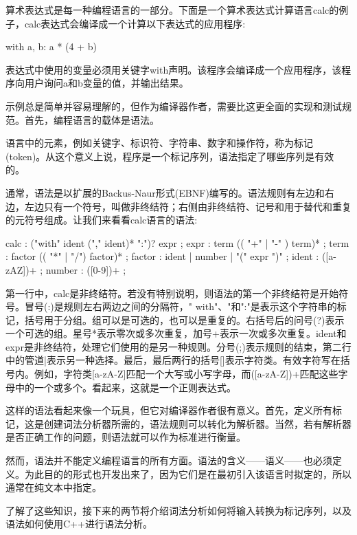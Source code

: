 
算术表达式是每一种编程语言的一部分。下面是一个算术表达式计算语言calc的例子，calc表达式会编译成一个计算以下表达式的应用程序:

\begin{shell}
with a, b: a * (4 + b)
\end{shell}

表达式中使用的变量必须用关键字with声明。该程序会编译成一个应用程序，该程序向用户询问a和b变量的值，并输出结果。

示例总是简单并容易理解的，但作为编译器作者，需要比这更全面的实现和测试规范。首先，编程语言的载体是语法。


语言中的元素，例如关键字、标识符、字符串、数字和操作符，称为标记(token)。从这个意义上说，程序是一个标记序列，语法指定了哪些序列是有效的。

通常，语法是以扩展的Backus-Naur形式(EBNF)编写的。语法规则有左边和右边，左边只有一个符号，叫做非终结符；右侧由非终结符、记号和用于替代和重复的元符号组成。让我们来看看calc语言的语法:

\begin{shell}
calc : ("with" ident ("," ident)* ":")? expr ;
expr : term (( "+" | "-" ) term)* ;
term : factor (( "*" | "/") factor)* ;
factor : ident | number | "(" expr ")" ;
ident : ([a-zAZ])+ ;
number : ([0-9])+ ;
\end{shell}

第一行中，calc是非终结符。若没有特别说明，则语法的第一个非终结符是开始符号。冒号(:)是规则左右两边之间的分隔符，" with"、"和":"是表示这个字符串的标记，括号用于分组。组可以是可选的，也可以是重复的。右括号后的问号(?)表示一个可选的组。星号*表示零次或多次重复，加号+表示一次或多次重复。ident和expr是非终结符，处理它们使用的是另一种规则。分号(;)表示规则的结束，第二行中的管道|表示另一种选择。最后，最后两行的括号[]表示字符类。有效字符写在括号内。例如，字符类[a-zA-Z]匹配一个大写或小写字母，而([a-zA-Z])+匹配这些字母中的一个或多个。看起来，这就是一个正则表达式。


这样的语法看起来像一个玩具，但它对编译器作者很有意义。首先，定义所有标记，这是创建词法分析器所需的，语法规则可以转化为解析器。当然，若有解析器是否正确工作的问题，则语法就可以作为标准进行衡量。

然而，语法并不能定义编程语言的所有方面。语法的含义——语义——也必须定义。为此目的的形式也开发出来了，因为它们是在最初引入该语言时拟定的，所以通常在纯文本中指定。

了解了这些知识，接下来的两节将介绍词法分析如何将输入转换为标记序列，以及语法如何使用C++进行语法分析。